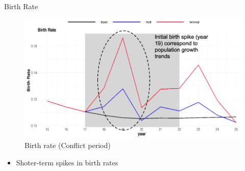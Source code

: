 \documentclass{beamer}
\begin{document}
		\begin{frame}{Birth Rate}
			\begin{center}
				\begin{figure}
					\includegraphics[width=\textwidth]{Images/birthrate.png}
					\caption{Birth rate (Conflict period)}
				\end{figure}
			\end{center} 	

			\begin{itemize}
				\item Shoter-term spikes in birth rates
			\end{itemize}

		\end{frame}
\end{document}
